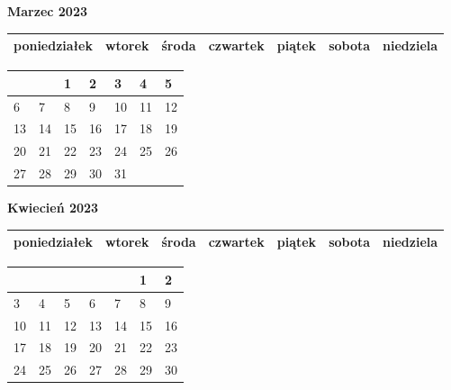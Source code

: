 \clearpage

\begin{landscape}
    \begin{center}
        \textbf{\huge{Marzec 2023}}
    \end{center}

    \vspace{-3mm}

    \thispagestyle{empty}
    \noindent
    \begin{tabularx}{28.7cm}{|Y|Y|Y|Y|Y|Y|Y|}
        \hline
poniedziałek & wtorek & środa & czwartek & piątek & sobota & niedziela \\ [-0.5mm]
        \hline
    \end{tabularx}

    \vspace{-0.5mm}

    \noindent
    \begin{tabularx}{28.7cm}{|X|X|X|X|X|X|X|}
        \hline
& & 1 & 2 & 3 & 4 & 5 \\ [31.0mm]
\hline
6 & 7 & 8 & 9 & 10 & 11 & 12 \\ [31.0mm]
\hline
13 & 14 & 15 & 16 & 17 & 18 & 19 \\ [31.0mm]
\hline
20 & 21 & 22 & 23 & 24 & 25 & 26 \\ [31.0mm]
\hline
27 & 28 & 29 & 30 & 31 & & \\ [31.0mm]
\hline

    \end{tabularx}
\end{landscape}

\clearpage

\begin{landscape}
    \begin{center}
        \textbf{\huge{Kwiecień 2023}}
    \end{center}

    \vspace{-3mm}

    \thispagestyle{empty}
    \noindent
    \begin{tabularx}{28.7cm}{|Y|Y|Y|Y|Y|Y|Y|}
        \hline
poniedziałek & wtorek & środa & czwartek & piątek & sobota & niedziela \\ [-0.5mm]
        \hline
    \end{tabularx}

    \vspace{-0.5mm}

    \noindent
    \begin{tabularx}{28.7cm}{|X|X|X|X|X|X|X|}
        \hline
& & & & & 1 & 2 \\ [31.0mm]
\hline
3 & 4 & 5 & 6 & 7 & 8 & 9 \\ [31.0mm]
\hline
10 & 11 & 12 & 13 & 14 & 15 & 16 \\ [31.0mm]
\hline
17 & 18 & 19 & 20 & 21 & 22 & 23 \\ [31.0mm]
\hline
24 & 25 & 26 & 27 & 28 & 29 & 30 \\ [31.0mm]
\hline

    \end{tabularx}
\end{landscape}

